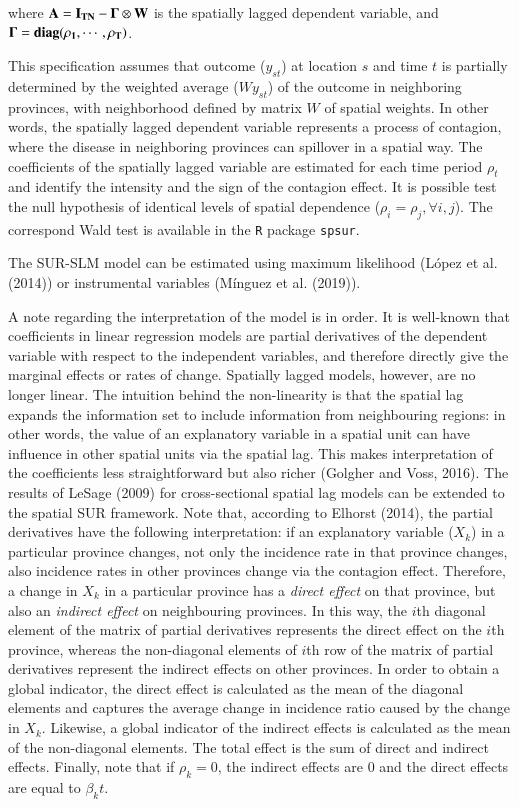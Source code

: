\documentclass[]{elsarticle} %
\begin{document}
\noindent where \(\bf{A} =I_{TN}-\bf{\Gamma} \otimes W\) is the
spatially lagged dependent variable, and
\(\bf{\Gamma} = diag(\rho_1, \cdots, \rho_T)\).

This specification assumes that outcome (\(y_{st}\)) at location \(s\)
and time \(t\) is partially determined by the weighted average
(\(Wy_{st}\)) of the outcome in neighboring provinces, with neighborhood
defined by matrix \(W\) of spatial weights. In other words, the
spatially lagged dependent variable represents a process of contagion,
where the disease in neighboring provinces can spillover in a spatial
way. The coefficients of the spatially lagged variable are estimated for
each time period \(\rho_t\) and identify the intensity and the sign of
the contagion effect. It is possible test the null hypothesis of
identical levels of spatial dependence (\(\rho_i=\rho_j, \forall i,j\)).
The correspond Wald test is available in the \texttt{R} package
\texttt{spsur}.

The SUR-SLM model can be estimated using maximum likelihood (López et
al. (2014)) or instrumental variables (Mínguez et al. (2019)).

A note regarding the interpretation of the model is in order. It is
well-known that coefficients in linear regression models are partial
derivatives of the dependent variable with respect to the independent
variables, and therefore directly give the marginal effects or rates of
change. Spatially lagged models, however, are no longer linear. The
intuition behind the non-linearity is that the spatial lag expands the
information set to include information from neighbouring regions: in
other words, the value of an explanatory variable in a spatial unit can
have influence in other spatial units via the spatial lag. This makes
interpretation of the coefficients less straightforward but also richer
(Golgher and Voss, 2016). The results of LeSage (2009) for
cross-sectional spatial lag models can be extended to the spatial SUR
framework. Note that, according to Elhorst (2014), the partial
derivatives have the following interpretation: if an explanatory
variable (\(X_k\)) in a particular province changes, not only the
incidence rate in that province changes, also incidence rates in other
provinces change via the contagion effect. Therefore, a change in
\(X_k\) in a particular province has a \emph{direct effect} on that
province, but also an \emph{indirect effect} on neighbouring provinces.
In this way, the \(i\)th diagonal element of the matrix of partial
derivatives represents the direct effect on the \(i\)th province,
whereas the non-diagonal elements of \(i\)th row of the matrix of
partial derivatives represent the indirect effects on other provinces.
In order to obtain a global indicator, the direct effect is calculated
as the mean of the diagonal elements and captures the average change in
incidence ratio caused by the change in \(X_k\). Likewise, a global
indicator of the indirect effects is calculated as the mean of the
non-diagonal elements. The total effect is the sum of direct and
indirect effects. Finally, note that if \(\rho_k = 0\), the indirect
effects are 0 and the direct effects are equal to \(\beta_kt\).
\end{document}
